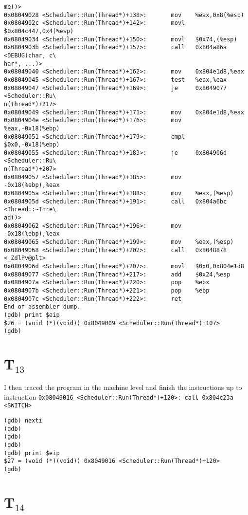 \documentclass[letterpaper, 10pt]{article}
\begin{document}
\begin{verbatim}
me()>
0x08049028 <Scheduler::Run(Thread*)+138>:       mov    %eax,0x8(%esp)
0x0804902c <Scheduler::Run(Thread*)+142>:       movl   $0x804c447,0x4(%esp)
0x08049034 <Scheduler::Run(Thread*)+150>:       movl   $0x74,(%esp)
0x0804903b <Scheduler::Run(Thread*)+157>:       call   0x804a86a <DEBUG(char, c\
har*, ...)>
0x08049040 <Scheduler::Run(Thread*)+162>:       mov    0x804e1d8,%eax
0x08049045 <Scheduler::Run(Thread*)+167>:       test   %eax,%eax
0x08049047 <Scheduler::Run(Thread*)+169>:       je     0x8049077 <Scheduler::Ru\
n(Thread*)+217>
0x08049049 <Scheduler::Run(Thread*)+171>:       mov    0x804e1d8,%eax
0x0804904e <Scheduler::Run(Thread*)+176>:       mov    %eax,-0x18(%ebp)
0x08049051 <Scheduler::Run(Thread*)+179>:       cmpl   $0x0,-0x18(%ebp)
0x08049055 <Scheduler::Run(Thread*)+183>:       je     0x804906d <Scheduler::Ru\
n(Thread*)+207>
0x08049057 <Scheduler::Run(Thread*)+185>:       mov    -0x18(%ebp),%eax
0x0804905a <Scheduler::Run(Thread*)+188>:       mov    %eax,(%esp)
0x0804905d <Scheduler::Run(Thread*)+191>:       call   0x804a6bc <Thread::~Thre\
ad()>
0x08049062 <Scheduler::Run(Thread*)+196>:       mov    -0x18(%ebp),%eax
0x08049065 <Scheduler::Run(Thread*)+199>:       mov    %eax,(%esp)
0x08049068 <Scheduler::Run(Thread*)+202>:       call   0x8048878 <_ZdlPv@plt>
0x0804906d <Scheduler::Run(Thread*)+207>:       movl   $0x0,0x804e1d8
0x08049077 <Scheduler::Run(Thread*)+217>:       add    $0x24,%esp
0x0804907a <Scheduler::Run(Thread*)+220>:       pop    %ebx
0x0804907b <Scheduler::Run(Thread*)+221>:       pop    %ebp
0x0804907c <Scheduler::Run(Thread*)+222>:       ret
End of assembler dump.
(gdb) print $eip
$26 = (void (*)(void)) 0x8049009 <Scheduler::Run(Thread*)+107>
(gdb)
	\end{verbatim}

	\section*{T$_{13}$}

	I then traced the program in the machine level and finish the instructions up to instruction {\tt 0x08049016 <Scheduler::Run(Thread*)+120>: call 0x804c23a <SWITCH>}

	\begin{verbatim}
(gdb) nexti
(gdb)
(gdb)
(gdb)
(gdb) print $eip
$27 = (void (*)(void)) 0x8049016 <Scheduler::Run(Thread*)+120>
(gdb)
	\end{verbatim}

	\section*{T$_{14}$}
\end{document}
